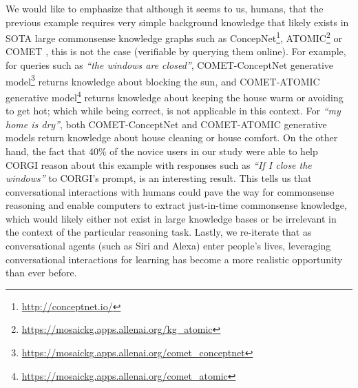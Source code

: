 We would like to emphasize that although it seems to us, humans, that the previous example requires very simple background knowledge that likely exists in SOTA large commonsense knowledge graphs such as ConcepNet\footnote{\url{http://conceptnet.io/}}, ATOMIC\footnote{\url{https://mosaickg.apps.allenai.org/kg_atomic}} or COMET \cite{bosselut2019comet}, this is not the case (verifiable by querying them online). 
For example, for queries such as \emph{``the windows are closed''}, COMET-ConceptNet generative model\footnote{\url{https://mosaickg.apps.allenai.org/comet_conceptnet}} returns knowledge about blocking the sun, and COMET-ATOMIC generative model\footnote{\url{https://mosaickg.apps.allenai.org/comet_atomic}} returns knowledge about keeping the house warm or avoiding to get hot; which while being correct, is not applicable in this context. For \emph{``my home is dry''}, both COMET-ConceptNet and COMET-ATOMIC generative models return knowledge about house cleaning or house comfort. On the other hand, the fact that 40\% of the novice users in our study were able to help CORGI reason about this example with responses such as \emph{``If I close the windows''} to CORGI's prompt, is an interesting result. This tells us that conversational interactions with humans could pave the way for commonsense reasoning and enable computers to extract just-in-time commonsense knowledge, which would likely either not exist in large knowledge bases or be irrelevant in the context of the particular reasoning task.  
Lastly, we re-iterate that as conversational agents (such as Siri and Alexa) enter people's lives, leveraging conversational interactions for learning has become a more realistic opportunity than ever before.
% 

